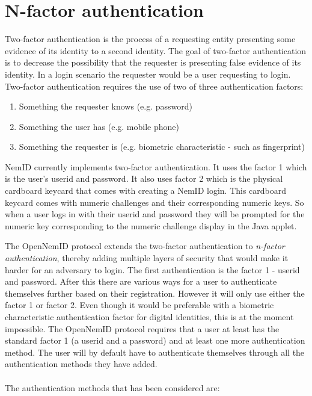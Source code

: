 \documentclass[twosided]{report}
\begin{document}
\section{N-factor authentication}
\label{sect:nfactauth}
Two-factor authentication is the process of a requesting entity presenting some evidence of its identity to a second identity. The goal of two-factor authentication is to decrease the possibility that the requester is presenting false evidence of its identity. In a login scenario the requester would be a user requesting to login. Two-factor authentication requires the use of two of three authentication factors:
\begin{enumerate}
\item Something the requester knows (e.g. password)
\item Something the user has (e.g. mobile phone)
\item Something the requester is (e.g. biometric characteristic - such as fingerprint)
\end{enumerate}
\par
NemID currently implements two-factor authentication. It uses the factor 1 which is the user's userid and password. It also uses factor 2 which is the physical cardboard keycard that comes with creating a NemID login. This cardboard keycard comes with numeric challenges and their corresponding numeric keys. So when a user logs in with their userid and password they will be prompted for the numeric key corresponding to the numeric challenge display in the Java applet.
\par
The OpenNemID protocol extends the two-factor authentication to \emph{n-factor authentication}, thereby adding multiple layers of security that would make it harder for an adversary to login. The first authentication is the factor 1 - userid and password. After this there are various ways for a user to authenticate themselves further based on their registration. However it will only use either the factor 1 or factor 2. Even though it would be preferable with a biometric characteristic authentication factor for digital identities, this is at the moment impossible. The OpenNemID protocol requires that a user at least has the standard factor 1 (a userid and a password) and at least one more authentication method. The user will by default have to authenticate themselves through all the authentication methods they have added.
\\
\\
The authentication methods that has been considered are:
\end{document}
